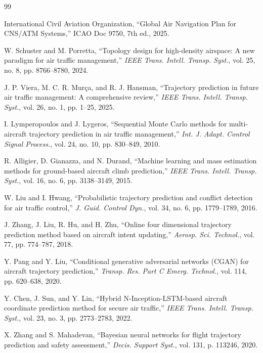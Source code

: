 \documentclass[letterpaper,journal]{IEEEtran}
\begin{document}
\begin{thebibliography}{99}


International Civil Aviation Organization, ``Global Air Navigation Plan for CNS/ATM Systems,'' ICAO Doc 9750, 7th ed., 2025.

W. Schuster and M. Porretta, ``Topology design for high-density airspace: A new paradigm for air traffic management,'' \textit{IEEE Trans. Intell. Transp. Syst.}, vol. 25, no. 8, pp. 8766--8780, 2024.

J. P. Viera, M. C. R. Mur\c{c}a, and R. J. Hansman, ``Trajectory prediction in future air traffic management: A comprehensive review,'' \textit{IEEE Trans. Intell. Transp. Syst.}, vol. 26, no. 1, pp. 1--25, 2025.

I. Lymperopoulos and J. Lygeros, ``Sequential Monte Carlo methods for multi-aircraft trajectory prediction in air traffic management,'' \textit{Int. J. Adapt. Control Signal Process.}, vol. 24, no. 10, pp. 830--849, 2010.

R. Alligier, D. Gianazza, and N. Durand, ``Machine learning and mass estimation methods for ground-based aircraft climb prediction,'' \textit{IEEE Trans. Intell. Transp. Syst.}, vol. 16, no. 6, pp. 3138--3149, 2015.

W. Liu and I. Hwang, ``Probabilistic trajectory prediction and conflict detection for air traffic control,'' \textit{J. Guid. Control Dyn.}, vol. 34, no. 6, pp. 1779--1789, 2016.

J. Zhang, J. Liu, R. Hu, and H. Zhu, ``Online four dimensional trajectory prediction method based on aircraft intent updating,'' \textit{Aerosp. Sci. Technol.}, vol. 77, pp. 774--787, 2018.

Y. Pang and Y. Liu, ``Conditional generative adversarial networks (CGAN) for aircraft trajectory prediction,'' \textit{Transp. Res. Part C Emerg. Technol.}, vol. 114, pp. 620--638, 2020.

Y. Chen, J. Sun, and Y. Lin, ``Hybrid N-Inception-LSTM-based aircraft coordinate prediction method for secure air traffic,'' \textit{IEEE Trans. Intell. Transp. Syst.}, vol. 23, no. 3, pp. 2773--2783, 2022.

X. Zhang and S. Mahadevan, ``Bayesian neural networks for flight trajectory prediction and safety assessment,'' \textit{Decis. Support Syst.}, vol. 131, p. 113246, 2020.


\end{thebibliography}
\end{document}
